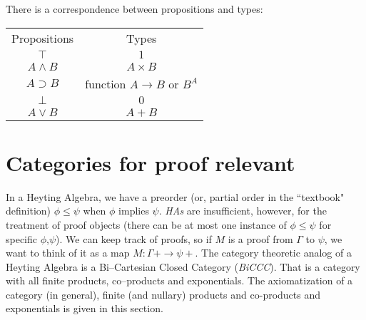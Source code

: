 There is a correspondence between propositions and types:
\begin{center}
  \begin{tabular}{@{} cc @{}}

    Propositions & Types \\

    $\top$ & $1$ \\
    $A\wedge B$ & $A\times B$ \\
    $A\supset B$ & function $A\to B$ or $B^A$ \\
    $\bot$ & $0$ \\
    $A\vee B$ & $A+B$\\

  \end{tabular}
\end{center}



\section{Categories for proof relevant }

In a Heyting Algebra, we have a preorder (or, partial order in the ``textbook" definition) $\phi\leq \psi$ when $\phi$ implies $\psi$. \emph{HAs} are insufficient, however, for the treatment of proof objects (there can be at most one instance of $\phi\leq\psi$ for specific $\phi$,$\psi$). We can  keep track of proofs, so if $M$ is a proof from  $\Gamma$ to $\psi$, we want to think of it as a map $M:\Gamma+\to \psi+$. The category theoretic analog of a Heyting 	Algebra is a Bi--Cartesian Closed Category (\emph{BiCCC}). That is a category with all finite products, co--products and exponentials. The axiomatization of a category (in general), finite (and nullary) products and co-products and exponentials is given in this section. 

